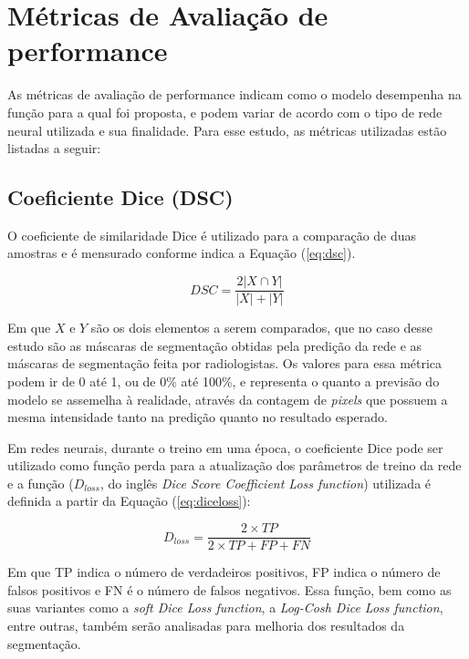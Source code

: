 \section{Métricas de Avaliação de performance}

As métricas de avaliação de performance indicam como o modelo desempenha na função para a qual foi proposta, e podem variar de acordo com o tipo de rede neural utilizada e sua finalidade. Para esse estudo, as métricas utilizadas estão listadas a seguir:

\subsection{Coeficiente Dice (DSC)}

O coeficiente de similaridade Dice é utilizado para a comparação de duas amostras e é mensurado conforme indica a Equação (\ref{eq:dsc}).

\begin{equation}\label{eq:dsc}
    DSC = \frac{2 \left| X \cap Y\right|}{\left|X\right| + \left|Y\right|}
\end{equation}

Em que $X$ e $Y$ são os dois elementos a serem comparados, que no caso desse estudo são as máscaras de segmentação obtidas pela predição da rede e as máscaras de segmentação feita por radiologistas. Os valores para essa métrica podem ir de 0 até 1, ou de 0\% até 100\%, e representa o quanto a previsão do modelo se assemelha à realidade, através da contagem de \textit{pixels} que possuem a mesma intensidade tanto na predição quanto no resultado esperado.

Em redes neurais, durante o treino em uma época, o coeficiente Dice pode ser utilizado como função perda para a atualização dos parâmetros de treino da rede e a função ($D_{loss}$, do inglês \textit{Dice Score Coefficient Loss function}) utilizada é definida a partir da Equação (\ref{eq:diceloss}):

\begin{equation}\label{eq:diceloss}
    D_{loss} = \frac{2\times TP}{2\times TP + FP + FN}
\end{equation}

Em que TP indica o número de verdadeiros positivos, FP indica o número de falsos positivos e FN é o número de falsos negativos. Essa função, bem como as suas variantes como a \textit{soft Dice Loss function}, a \textit{Log-Cosh Dice Loss function}, entre outras, também serão analisadas para melhoria dos resultados da segmentação.


